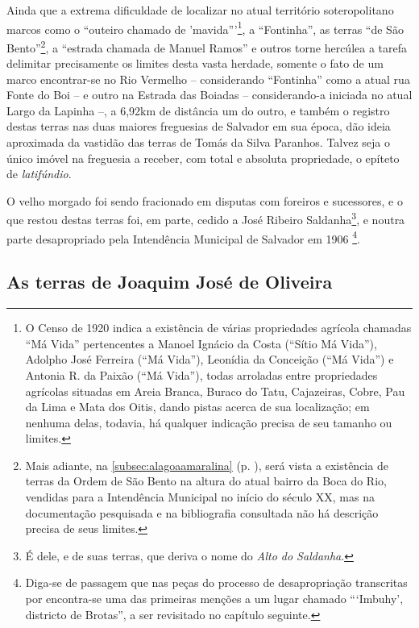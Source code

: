 Ainda que a extrema dificuldade de localizar no atual território soteropolitano marcos como o ``outeiro chamado de 'mavida'''\footnote{O Censo de 1920 indica a existência de várias propriedades agrícola chamadas ``Má Vida'' pertencentes a Manoel Ignácio da Costa (``Sítio Má Vida''), Adolpho José Ferreira (``Má Vida''), Leonídia da Conceição (``Má Vida'') e Antonia R. da Paixão (``Má Vida''), todas arroladas entre propriedades agrícolas situadas em Areia Branca, Buraco do Tatu, Cajazeiras, Cobre, Pau da Lima e Mata dos Oitis, dando pistas acerca de sua localização; em nenhuma delas, todavia, há qualquer indicação precisa de seu tamanho ou limites.}, a ``Fontinha'', as terras ``de São Bento''\footnote{Mais adiante, na \autoref{subsec:alagoaamaralina} (p. \pageref{subsec:alagoaamaralina}), será vista a existência de terras da Ordem de São Bento na altura do atual bairro da Boca do Rio, vendidas para a Intendência Municipal no início do século XX, mas na documentação pesquisada e na bibliografia consultada não há descrição precisa de seus limites.}, a ``estrada chamada de Manuel Ramos'' e outros torne hercúlea a tarefa  delimitar precisamente os limites desta vasta herdade, somente o fato de um marco encontrar-se no Rio Vermelho -- considerando ``Fontinha'' como a atual rua Fonte do Boi -- e outro na Estrada das Boiadas -- considerando-a iniciada no atual Largo da Lapinha --, a 6,92km de distância um do outro, e também o registro destas terras nas duas maiores freguesias de Salvador em sua época, dão ideia aproximada da vastidão das terras de Tomás da Silva Paranhos. Talvez seja o único imóvel na freguesia a receber, com total e absoluta propriedade, o epíteto de \textit{latifúndio}. 

O velho morgado foi sendo fracionado em disputas com foreiros e sucessores, e o que restou destas terras foi, em parte, cedido a José Ribeiro Saldanha\footnote{É dele, e de suas terras, que deriva o nome do \textit{Alto do Saldanha}.}, e noutra parte desapropriado pela Intendência Municipal de Salvador em 1906 \cite[p.~III-13 - III-14]{teixeira_doacoes_1978}\footnote{Diga-se de passagem que nas peças do processo de desapropriação transcritas por  encontra-se uma das primeiras menções a um lugar chamado ```Imbuhy', districto de Brotas'', a ser revisitado no capítulo seguinte.}.

\subsection{As terras de Joaquim José de Oliveira}\label{subsec:josejoaquim}

